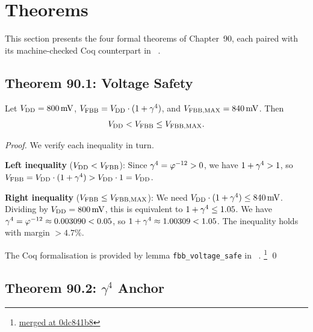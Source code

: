 \medskip
\noindent\anchorline{}

\section{Theorems}
\label{sec:theorems}

This section presents the four formal theorems of Chapter~90, each
paired with its machine-checked Coq counterpart in
\coqfile{}~\cite{CoqFBBActive2026}.

\subsection{Theorem 90.1: Voltage Safety}
\label{subsec:thm1}

\begin{theorem}\label{thm:voltage-safety}
  Let $V_{\mathrm{DD}} = 800\,\mathrm{mV}$, $V_{\mathrm{FBB}} = V_{\mathrm{DD}} \cdot (1 + \gamma^{4}{})$,
  and $V_{\mathrm{FBB,MAX}} = 840\,\mathrm{mV}$.  Then
  \[
    V_{\mathrm{DD}} < V_{\mathrm{FBB}} \leq V_{\mathrm{FBB,MAX}}.
  \]
\end{theorem}

\begin{proof}
  We verify each inequality in turn.

  \medskip
  \noindent\textbf{Left inequality} ($V_{\mathrm{DD}} < V_{\mathrm{FBB}}$):
  Since $\gamma^{4}{} = \varphi^{-12}{} > 0$, we have
  $1 + \gamma^{4}{} > 1$, so
  $V_{\mathrm{FBB}} = V_{\mathrm{DD}} \cdot (1 + \gamma^{4}{}) > V_{\mathrm{DD}} \cdot 1 = V_{\mathrm{DD}}$.

  \medskip
  \noindent\textbf{Right inequality} ($V_{\mathrm{FBB}} \leq V_{\mathrm{FBB,MAX}}$):
  We need $V_{\mathrm{DD}} \cdot (1 + \gamma^{4}{}) \leq 840\,\mathrm{mV}$.
  Dividing by $V_{\mathrm{DD}} = 800\,\mathrm{mV}$, this is equivalent to
  $1 + \gamma^{4}{} \leq 1.05$.  We have
  $\gamma^{4}{} = \varphi^{-12}{} \approx 0.003090 < 0.05$,
  so $1 + \gamma^{4}{} \approx 1.00309 < 1.05$.
  The inequality holds with margin $> 4.7\%$.

  The Coq formalisation is provided by lemma \texttt{fbb\_voltage\_safe}
  in \coqfile{}~\cite{CoqFBBActive2026}.%
  \footnote{\href{https://github.com/gHashTag/t27/blob/master/trios-coq/Physics/FBBActive.v}%
    {merged at 0dc841b8}}
  \qed
\end{proof}

\subsection{Theorem 90.2: \texorpdfstring{$\gamma^{4}$}{gamma^4} Anchor}
\label{subsec:thm2}

